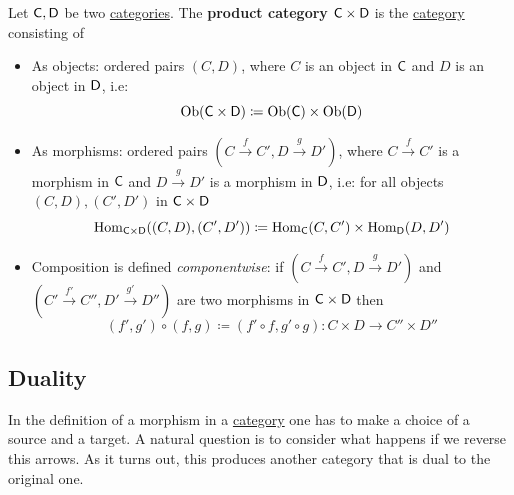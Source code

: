 \documentclass[../../main]{subfiles}
\begin{document}
\begin{definition}\label{def:product-category}
  Let \(\mathsf{C}, \mathsf{D}\) be two \hyperref[def:category]{categories}.
  The \textbf{product category} \(\mathsf{C} \times \mathsf{D}\) is the \hyperref[def:category]{category} consisting of
  \begin{itemize}
    \item As objects: ordered pairs \((C, D)\), where \(C\) is an object in \(\mathsf{C}\) and \(D\) is an object in \(\mathsf{D}\), i.e:
          \begin{equation*}
            \operatorname{Ob}(\mathsf{C} \times \mathsf{D}) \coloneq \operatorname{Ob}(\mathsf{C}) \times \operatorname{Ob}(\mathsf{D})
          \end{equation*}
    \item As morphisms: ordered pairs \((C \xrightarrow{f} C', D \xrightarrow{g} D')\), where \(C \xrightarrow{f} C'\) is a morphism in \(\mathsf{C}\) and \(D \xrightarrow{g} D'\) is a morphism in \(\mathsf{D}\), i.e: for all objects \((C, D), (C', D')\) in \(\mathsf{C} \times \mathsf{D}\)
          \begin{equation*}
            \operatorname{Hom}_{\mathsf{C} \times \mathsf{D}}((C, D), (C', D')) \coloneq \operatorname{Hom}_{\mathsf{C}}(C, C') \times \operatorname{Hom}_{\mathsf{D}}(D, D')
          \end{equation*}
    \item Composition is defined \textit{componentwise}: if \((C \xrightarrow{f} C', D \xrightarrow{g} D')\) and \((C' \xrightarrow{f'} C'', D' \xrightarrow{g'} D'')\) are two morphisms in \(\mathsf{C} \times \mathsf{D}\) then
          \begin{equation*}
            (f', g') \circ (f, g) \coloneq (f' \circ f, g' \circ g): C \times D \to C'' \times D''
          \end{equation*}
  \end{itemize}
\end{definition}

\subsection{Duality}

In the definition of a morphism in a \hyperref[def:category]{category} one has to make a choice of a source and a target.
A natural question is to consider what happens if we reverse this arrows.
As it turns out, this produces another category that is dual to the original one.
\end{document}
